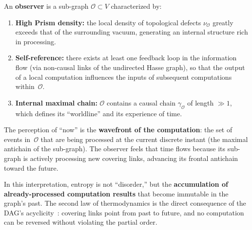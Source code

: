 \begin{definition}
\label{def:observer}
An \textbf{observer} is a sub-graph $\mathcal{O} \subset V$
characterized by:
\begin{enumerate}
  \item \textbf{High Prism density:} the local density of topological
    defects $\nu_{\mathcal{O}}$ greatly exceeds that of the surrounding
    vacuum, generating an internal structure rich in processing.
  \item \textbf{Self-reference:} there exists at least one feedback loop
    in the information flow (via non-causal links of the undirected Hasse
    graph), so that the output of a local computation influences the
    inputs of subsequent computations within~$\mathcal{O}$.
  \item \textbf{Internal maximal chain:} $\mathcal{O}$ contains a causal
    chain $\gamma_\mathcal{O}$ of length $\gg 1$, which defines its
    ``worldline'' and its experience of time.
\end{enumerate}
\end{definition}

\noindent
The perception of ``now'' is the \textbf{wavefront of the computation}:
the set of events in~$\mathcal{O}$ that are being processed at the
current discrete instant (the maximal antichain of the sub-graph). The
observer feels that time flows because its sub-graph is actively
processing new covering links, advancing its frontal antichain toward the
future.

\begin{result}[title={Entropy as Accumulated Computation}]
\label{res:entropy-computation}
In this interpretation, entropy is not ``disorder,'' but the
\textbf{accumulation of already-processed computation results} that
become immutable in the graph's past. The second law of thermodynamics is
the direct consequence of the DAG's
acyclicity~\cite{sorkin1986,bekenstein1973}: covering links point from
past to future, and no computation can be reversed without violating the
partial order.
\end{result}



